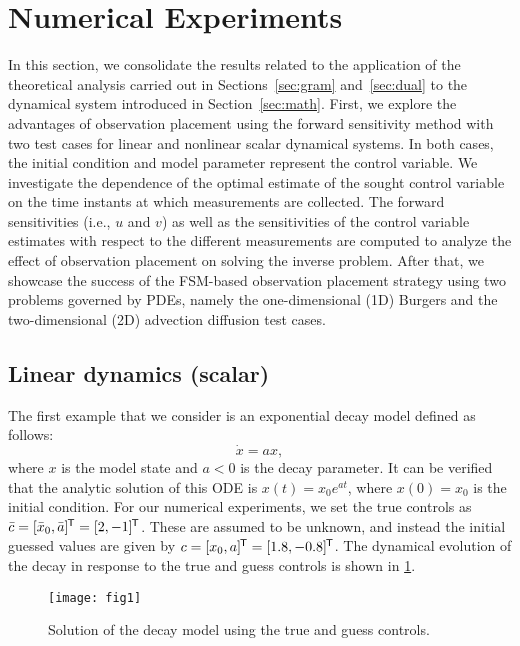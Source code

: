 \documentclass{article}
\newcommand*{\tran}{^{\mkern-1.5mu\mathsf{T}}}
\begin{document}
\section{Numerical Experiments} \label{sec:res}
In this section, we consolidate the results related to the application of the theoretical analysis carried out in Sections~\ref{sec:gram} and~\ref{sec:dual} to the dynamical system introduced in Section~\ref{sec:math}. \textcolor{rev}{First, we explore the advantages of observation placement using the forward sensitivity method with two test cases for linear and nonlinear scalar dynamical systems.} In both cases, the initial condition and model parameter represent the control variable. We investigate the dependence of the optimal estimate of the sought control variable on the time instants at which measurements are collected. The forward sensitivities (i.e., $u$ and $v$) as well as the sensitivities of the control variable estimates with respect to the different measurements are computed to analyze the effect of observation placement on solving the inverse problem. \textcolor{rev}{After that, we showcase the success of the FSM-based observation placement strategy using two problems governed by PDEs, namely the one-dimensional (1D) Burgers and the two-dimensional (2D) advection diffusion test cases.}

\subsection{Linear dynamics (scalar)}
The first example that we consider is an exponential decay model defined as follows:
\begin{equation}
    \dot{x} = ax,
\end{equation}
where $x$ is the model state and $a<0$ is the decay parameter. It can be verified that the analytic solution of this ODE is $x(t) = x_0 e^{at}$, where $x(0)=x_0$ is the initial condition. For our numerical experiments, we set the true controls as $\bar{c}=[\bar{x}_0, \bar{a}]\tran = [2,-1]\tran$. These are assumed to be unknown, and instead the initial guessed values are given by $c=[x_0, a]\tran = [1.8,-0.8]\tran$. The dynamical evolution of the decay in response to the true and guess controls is shown in \cref{fig:xtrue}.
\begin{figure}[ht!]
    \centering
    \texttt{[image: fig1]}
    \caption{Solution of the decay model using the true and guess controls.}
    \label{fig:xtrue}
\end{figure}
\end{document}
